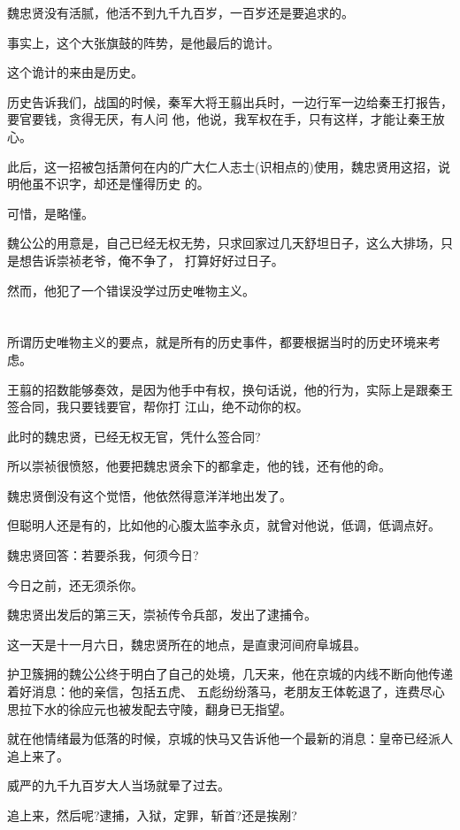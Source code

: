 \documentclass[11pt,a4paper,onecolumn]{article}
\begin{document}
魏忠贤没有活腻，他活不到九千九百岁，一百岁还是要追求的。

事实上，这个大张旗鼓的阵势，是他最后的诡计。

这个诡计的来由是历史。

历史告诉我们，战国的时候，秦军大将王翦出兵时，一边行军一边给秦王打报告，要官要钱，贪得无厌，有人问
他，他说，我军权在手，只有这样，才能让秦王放心。

此后，这一招被包括萧何在内的广大仁人志士(识相点的)使用，魏忠贤用这招，说明他虽不识字，却还是懂得历史
的。

可惜，是略懂。

魏公公的用意是，自己已经无权无势，只求回家过几天舒坦日子，这么大排场，只是想告诉崇祯老爷，俺不争了，
打算好好过日子。

然而，他犯了一个错误\myrule 没学过历史唯物主义。

\section[\thesection]{}

所谓历史唯物主义的要点，就是所有的历史事件，都要根据当时的历史环境来考虑。

王翦的招数能够奏效，是因为他手中有权，换句话说，他的行为，实际上是跟秦王签合同，我只要钱要官，帮你打
江山，绝不动你的权。

此时的魏忠贤，已经无权无官，凭什么签合同?

所以崇祯很愤怒，他要把魏忠贤余下的都拿走，他的钱，还有他的命。

魏忠贤倒没有这个觉悟，他依然得意洋洋地出发了。

但聪明人还是有的，比如他的心腹太监李永贞，就曾对他说，低调，低调点好。

魏忠贤回答：若要杀我，何须今日?

今日之前，还无须杀你。

魏忠贤出发后的第三天，崇祯传令兵部，发出了逮捕令。

这一天是十一月六日，魏忠贤所在的地点，是直隶河间府阜城县。

护卫簇拥的魏公公终于明白了自己的处境，几天来，他在京城的内线不断向他传递着好消息：他的亲信，包括五虎、
五彪纷纷落马，老朋友王体乾退了，连费尽心思拉下水的徐应元也被发配去守陵，翻身已无指望。

就在他情绪最为低落的时候，京城的快马又告诉他一个最新的消息：皇帝已经派人追上来了。

威严的九千九百岁大人当场就晕了过去。

追上来，然后呢?逮捕，入狱，定罪，斩首?还是挨剐?
\end{document}
